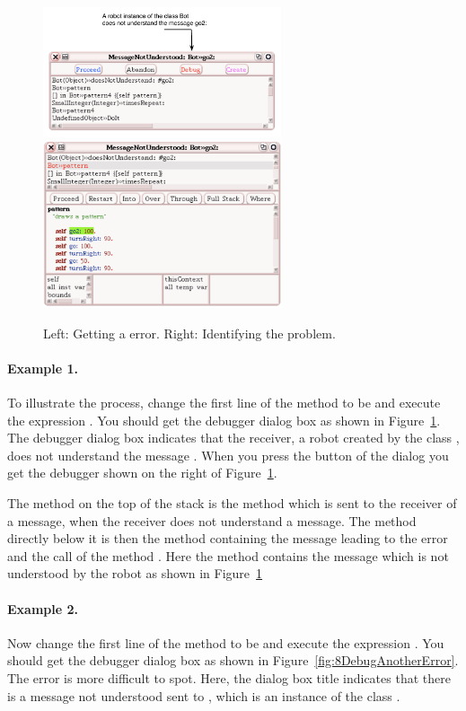 \begin{figure}[h]
\centerline{\includegraphics[width=7cm]{11DebuggerGo2Annotated} \includegraphics[width=7cm]{12DebuggerError}}
\caption{Left: Getting a  error. Right: Identifying the problem.\label{fig:11DebuggerGo2}}
\end{figure}


\paragraph{Example 1.} To illustrate the process, change the first line of the method  to be  and  execute the expression . You should get the debugger dialog box as shown in Figure~\ref{fig:11DebuggerGo2}.
The debugger dialog box indicates that the receiver, a robot created by the class , does not understand the message . When you press the button  of the dialog you get the debugger shown on the right of Figure~\ref{fig:11DebuggerGo2}.

The method on the top of the stack is the method  which is sent to the receiver of a message, when the receiver does not understand a message. The method directly below it is then the method containing the message leading to the error and the call of the method . Here the method  contains the message  which is not understood by the robot as shown in Figure~\ref{fig:11DebuggerGo2}


\paragraph{Example 2.} 
Now change the first line of the method  to be  and  execute the expression . You should get the debugger dialog box as shown in Figure~\ref{fig:8DebugAnotherError}. The error is more difficult to spot. 
Here, the dialog box title  indicates that there is a message not understood sent to , which is an instance of the class .



